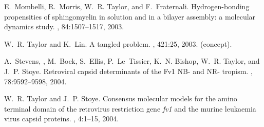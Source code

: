 \begin{thebibliography}{100}
E.~Mombelli, R.~Morris, W.~R. Taylor, and F.~Fraternali.
\newblock Hydrogen-bonding propensities of sphingomyelin in solution and in a
  bilayer assembly: a molecular dynamics study.
, 84:1507--1517, 2003.

W.~R. Taylor and K.~Lin.
\newblock A tangled problem.
, 421:25, 2003.
\newblock (concept).

A.~Stevens, , M.~Bock, S.~Ellis, P.~Le~Tissier, K.~N. Bishop, W.~R. Taylor, and
  J.~P. Stoye.
\newblock Retroviral capsid determinants of the {Fv1 NB-} and {NR-} tropism.
, 78:9592--9598, 2004.

W.~R. Taylor and J.~P. Stoye.
\newblock Consensus molecular models for the amino terminal domain of the
  retrovirus restriction gene {\em fv1} and the murine leukaemia virus capsid
  proteins.
, 4:1--15, 2004.

\end{thebibliography}
